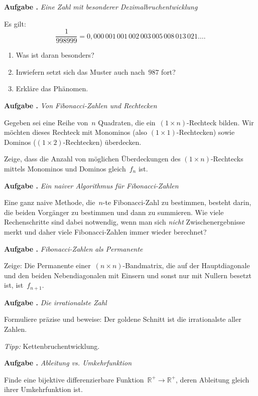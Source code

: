 \documentclass[a4paper,ngerman,twoside]{scrartcl}
\newlength{\aufgabenskip}
\newcounter{aufgabennummer}
\newenvironment{aufgabe}[1]{
  \addtocounter{aufgabennummer}{1}
  \textbf{Aufgabe \theaufgabennummer.} \emph{#1} \par
}{\vspace{\aufgabenskip}}
\newcommand{\RR}{\mathbb{R}}
\begin{document}
\begin{aufgabe}{Eine Zahl mit besonderer Dezimalbruchentwicklung}
Es gilt:
\[ \frac{1}{998999} =
  0{,}000\,001\,001\,002\,003\,005\,008\,013\,021\ldots. \]
\begin{enumerate}
\item Was ist daran besonders?
\item Inwiefern setzt sich das Muster auch nach~$987$ fort?
\item Erkläre das Phänomen.
\end{enumerate}
\end{aufgabe}

\begin{aufgabe}{Von Fibonacci-Zahlen und Rechtecken}
Gegeben sei eine Reihe von~$n$ Quadraten, die ein~$(1 \times n)$-Rechteck
bilden. Wir möchten dieses Rechteck mit Monominos (also
$(1 \times 1)$-Rechtecken) sowie Dominos ($(1\times 2)$-Rechtecken) überdecken.

Zeige, dass die Anzahl von möglichen Überdeckungen des $(1 \times n)$-Rechtecks
mittels Monominos und Dominos gleich~$f_n$ ist.
\end{aufgabe}

\begin{aufgabe}{Ein naiver Algorithmus für Fibonacci-Zahlen}
Eine ganz naive Methode, die~$n$-te Fibonacci-Zahl zu bestimmen, besteht
darin, die beiden Vorgänger zu bestimmen und dann zu summieren. Wie viele
Rechenschritte sind dabei notwendig, wenn man sich \emph{nicht}
Zwischenergebnisse merkt und daher viele Fibonacci-Zahlen immer wieder
berechnet?
\end{aufgabe}

\begin{aufgabe}{Fibonacci-Zahlen als Permanente}
Zeige: Die Permanente einer~$(n \times n)$-Bandmatrix, die auf der
Hauptdiagonale und den beiden Nebendiagonalen mit Einsern und sonst nur mit
Nullern besetzt ist, ist~$f_{n+1}$.
\end{aufgabe}

\begin{aufgabe}{Die irrationalste Zahl}
Formuliere präzise und beweise: Der goldene Schnitt ist die irrationalste aller
Zahlen.

\emph{Tipp:} Kettenbruchentwicklung.
\end{aufgabe}

\begin{aufgabe}{Ableitung vs. Umkehrfunktion}
Finde eine bijektive differenzierbare Funktion~$\RR^+ \to \RR^+$, deren
Ableitung gleich ihrer Umkehrfunktion ist.
\end{aufgabe}
\end{document}
